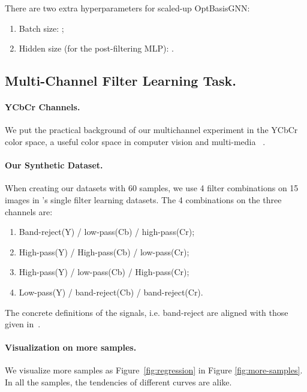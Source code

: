 There are two extra hyperparameters for scaled-up OptBasisGNN:
\begin{enumerate}[topsep=0pt,itemsep=-1ex,partopsep=1ex,parsep=1ex]
\item Batch size: ; 
\item Hidden size (for the post-filtering MLP): .  
\end{enumerate}


\subsection{Multi-Channel Filter Learning Task.}
\label{expappendix:regression}

\paragraph*{YCbCr Channels.}
We put the practical background of our multichannel experiment in 
the YCbCr color space, a useful color space in computer vision and multi-media
~\cite{shaik2015YCbCr}. 

\paragraph*{Our Synthetic Dataset.}
When creating our datasets with 60 samples, 
we use 4 filter combinations on 15 images in \citet{He2021bern}'s single filter learning datasets. The 4 combinations on the three channels are: 
\begin{enumerate}[topsep=0pt,itemsep=-1ex,partopsep=1ex,parsep=1ex]
    \item Band-reject(Y) / low-pass(Cb) / high-pass(Cr); 
    \item High-pass(Y) / High-pass(Cb) / low-pass(Cr);
    \item High-pass(Y) / low-pass(Cb) / High-pass(Cr);
    \item Low-pass(Y) / band-reject(Cb) / band-reject(Cr).
\end{enumerate}

The concrete definitions of the signals, i.e. band-reject are aligned with those given in~\citet{he2022chebii}.

\paragraph*{Visualization on more samples.} We visualize more samples as Figure~\ref{fig:regression} in Figure \ref{fig:more-samples}. In all the samples, the tendencies of different curves are alike. 







